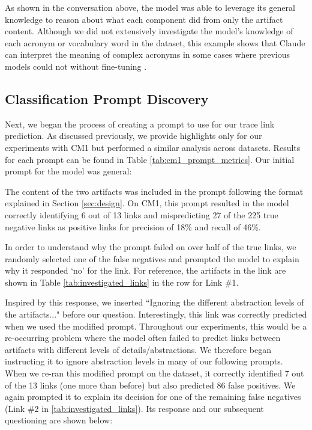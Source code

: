 As shown in the conversation above, the model was able to leverage its general knowledge to reason about what each component did from only the artifact content. Although we did not extensively investigate the model's knowledge of each acronym or vocabulary word in the dataset, this example shows that Claude can interpret the meaning of complex acronyms in some cases where previous models could not without fine-tuning \cite{bert_nl, bert_pl}. 

\subsection{Classification Prompt Discovery}

Next, we began the process of creating a prompt to use for our trace link prediction. As discussed previously, we provide highlights only for our experiments with CM1 but performed a similar analysis across datasets. Results for each prompt can be found in Table \ref{tab:cm1_prompt_metrics}.
Our initial prompt for the model was general:

The content of the two artifacts was included in the prompt following the format explained in Section \ref{sec:design}. On CM1, this prompt resulted in the model correctly identifying 6 out of 13 links and mispredicting 27 of the 225 true negative links as positive links for precision of 18\% and recall of 46\%.

In order to understand why the prompt failed on over half of the true links, we randomly selected one of the false negatives and prompted the model to explain why it responded `no' for the link. For reference, the artifacts in the link are shown in Table \ref{tab:investigated_links} in the row for Link \#1.  


Inspired by this response, we inserted ``Ignoring the different abstraction levels of the artifacts..." before our question. Interestingly, this link was correctly predicted when we used the modified prompt. Throughout our experiments, this would be a re-occurring problem where the model often failed to predict links between artifacts with different levels of details/abstractions. We therefore began instructing it to ignore abstraction levels in many of our following prompts. When we re-ran this modified prompt on the dataset, it correctly identified 7 out of the 13 links (one more than before) but also predicted 86 false positives. We again prompted it to explain its decision for one of the remaining false negatives (Link \#2 in \ref{tab:investigated_links}). Its response and our subsequent questioning are shown below:

